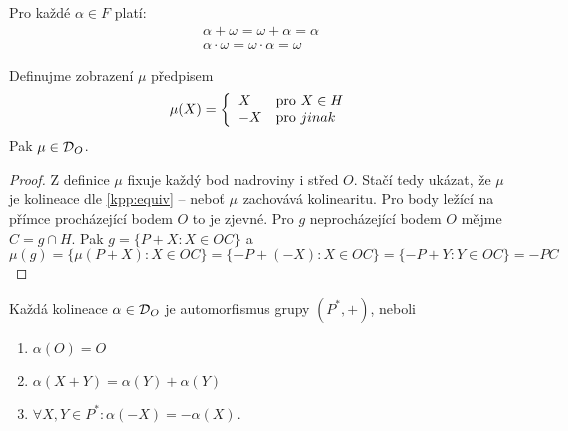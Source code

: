 \begin{observation}
	Pro každé $\alpha \in F$ platí:
	\begin{gather*}
		\alpha + \omega = \omega + \alpha = \alpha \\
		\alpha \cdot \omega = \omega \cdot \alpha = \omega
	\end{gather*}
\end{observation}

\begin{lemma}[O zobrazení $\mu$]
    Definujme zobrazení $\mu$ předpisem
    \[ \mu(X) = \left\{ \begin{array}{ll} X & \mbox{pro } X \in H \\ -X & \mbox{pro } jinak \end{array} \right. \]
    Pak $\mu\in \operatorname{\mathcal{D}}_O$.
\end{lemma}
\begin{proof}
    Z definice $\mu$ fixuje každý bod nadroviny i střed $O$.
    Stačí tedy ukázat, že $\mu$ je kolineace dle \cref{kpp:equiv} -- neboť $\mu$ zachovává kolinearitu.
    Pro body ležící na přímce procházející bodem $O$ to je zjevné.
    Pro $g$ neprocházející bodem $O$ mějme $C=g\cap H$.
    Pak $g=\{P+X: X\in OC\}$ a
    \[ \mu(g) = \{\mu(P+X): X\in OC\} = \{-P+(-X):X\in OC\}=\{-P+Y: Y\in OC\}=-PC \]
\end{proof}
\begin{lemma}
    Každá kolineace $\alpha\in \operatorname{\mathcal{D}}_O$ je automorfismus grupy $(P^*,+)$, neboli
	\begin{enumerate}
		\item $\alpha(O)=O$
		\item $\alpha(X+Y)=\alpha(Y)+\alpha(Y)$
		\item $\forall X,Y \in P^*: \alpha(-X)=-\alpha(X)$.
	\end{enumerate}
\end{lemma}

